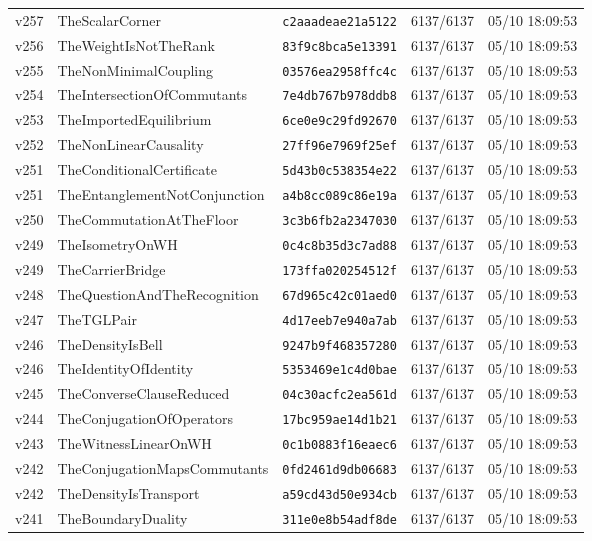 \documentclass[11pt]{article}
\theoremstyle{definition}\newtheorem{deriv}{Derivação}
\begin{document}
{\begin{longtable}{@{}lllll@{}}
v257 & TheScalarCorner & \texttt{c2aaadeae21a5122} & 6137/6137 & 05/10 18:09:53 \\
v256 & TheWeightIsNotTheRank & \texttt{83f9c8bca5e13391} & 6137/6137 & 05/10 18:09:53 \\
v255 & TheNonMinimalCoupling & \texttt{03576ea2958ffc4c} & 6137/6137 & 05/10 18:09:53 \\
v254 & TheIntersectionOfCommutants & \texttt{7e4db767b978ddb8} & 6137/6137 & 05/10 18:09:53 \\
v253 & TheImportedEquilibrium & \texttt{6ce0e9c29fd92670} & 6137/6137 & 05/10 18:09:53 \\
v252 & TheNonLinearCausality & \texttt{27ff96e7969f25ef} & 6137/6137 & 05/10 18:09:53 \\
v251 & TheConditionalCertificate & \texttt{5d43b0c538354e22} & 6137/6137 & 05/10 18:09:53 \\
v251 & TheEntanglementNotConjunction & \texttt{a4b8cc089c86e19a} & 6137/6137 & 05/10 18:09:53 \\
v250 & TheCommutationAtTheFloor & \texttt{3c3b6fb2a2347030} & 6137/6137 & 05/10 18:09:53 \\
v249 & TheIsometryOnWH & \texttt{0c4c8b35d3c7ad88} & 6137/6137 & 05/10 18:09:53 \\
v249 & TheCarrierBridge & \texttt{173ffa020254512f} & 6137/6137 & 05/10 18:09:53 \\
v248 & TheQuestionAndTheRecognition & \texttt{67d965c42c01aed0} & 6137/6137 & 05/10 18:09:53 \\
v247 & TheTGLPair & \texttt{4d17eeb7e940a7ab} & 6137/6137 & 05/10 18:09:53 \\
v246 & TheDensityIsBell & \texttt{9247b9f468357280} & 6137/6137 & 05/10 18:09:53 \\
v246 & TheIdentityOfIdentity & \texttt{5353469e1c4d0bae} & 6137/6137 & 05/10 18:09:53 \\
v245 & TheConverseClauseReduced & \texttt{04c30acfc2ea561d} & 6137/6137 & 05/10 18:09:53 \\
v244 & TheConjugationOfOperators & \texttt{17bc959ae14d1b21} & 6137/6137 & 05/10 18:09:53 \\
v243 & TheWitnessLinearOnWH & \texttt{0c1b0883f16eaec6} & 6137/6137 & 05/10 18:09:53 \\
v242 & TheConjugationMapsCommutants & \texttt{0fd2461d9db06683} & 6137/6137 & 05/10 18:09:53 \\
v242 & TheDensityIsTransport & \texttt{a59cd43d50e934cb} & 6137/6137 & 05/10 18:09:53 \\
v241 & TheBoundaryDuality & \texttt{311e0e8b54adf8de} & 6137/6137 & 05/10 18:09:53 \\

\end{longtable}}
\end{document}
